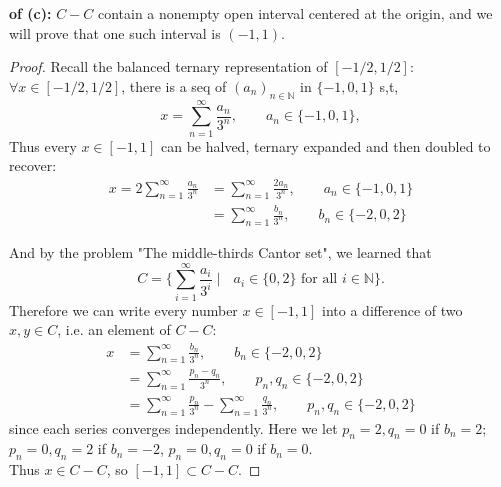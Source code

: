 \documentclass[lang=cn,11pt]{elegantbook}
\begin{document}
\begin{solution}
        \textbf{of (c):} $C-C$ contain a nonempty open interval centered at the origin, and we will prove that one such interval is $(-1,1)$.
\begin{proof}
Recall the balanced ternary representation of $[-1/2, 1/2]$: $\forall x\in [-1/2, 1/2]$, there is a seq of $(a_n)_{n\in\mathbb{N}} $ in $\{-1,0,1\}$ s,t,
\[
x=\sum_{n=1}^\infty \frac{a_n}{3^n},\qquad a_n\in\{-1,0,1\},
\]
Thus every $x\in [-1,1]$ can be halved, ternary expanded and then doubled to recover:
\begin{align}
    x=2\sum_{n=1}^\infty \frac{a_n}{3^n} &= \sum_{n=1}^\infty \frac{2a_n}{3^n},\qquad a_n\in\{-1,0,1\} \\
    &= \sum_{n=1}^\infty \frac{b_n}{3^n},\qquad b_n\in\{-2,0,2\} 
\end{align}

And by the problem "The middle-thirds Cantor set", we learned that \[
    C=\{ \sum_{i=1}^\infty \frac{a_i}{3^i} \mid \text{ $a_i\in \{0,2\}$ for all $i\in \mathbb{N}$} \}.
  \]
Therefore we can write every number $x \in [-1, 1]$ into a difference of two $x,y \in C$, i.e. an element of $C-C$:
\begin{align}
    x &= \sum_{n=1}^\infty \frac{b_n}{3^n},\qquad b_n\in\{-2,0,2\} \\
    &= \sum_{n=1}^\infty \frac{p_n-q_n}{3^n},\qquad p_n,q_n\in\{-2,0,2\}\\
    &= \sum_{n=1}^\infty \frac{p_n}{3^n} - \sum_{n=1}^\infty \frac{q_n}{3^n},\qquad p_n,q_n\in\{-2,0,2\}
\end{align}
since each series converges independently. Here we let $p_n = 2, q_n = 0$ if $b_n = 2$; $p_n = 0, q_n = 2$ if $b_n = -2$, $p_n = 0, q_n = 0$ if $b_n = 0$.\\
Thus $x \in C-C$, so $[-1,1] \subset C-C$.
\end{proof}

\end{solution}
\end{document}
